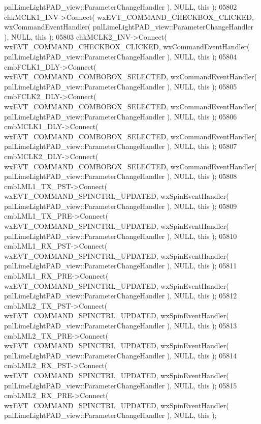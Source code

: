 \begin{DoxyCode}
      pnlLimeLightPAD_view::ParameterChangeHandler ), NULL, \textcolor{keyword}{this} );
05802     chkMCLK1_INV->Connect( wxEVT\_COMMAND\_CHECKBOX\_CLICKED, wxCommandEventHandler( 
      pnlLimeLightPAD_view::ParameterChangeHandler ), NULL, \textcolor{keyword}{this} );
05803     chkMCLK2_INV->Connect( wxEVT\_COMMAND\_CHECKBOX\_CLICKED, wxCommandEventHandler( 
      pnlLimeLightPAD_view::ParameterChangeHandler ), NULL, \textcolor{keyword}{this} );
05804     cmbFCLK1_DLY->Connect( wxEVT\_COMMAND\_COMBOBOX\_SELECTED, wxCommandEventHandler( 
      pnlLimeLightPAD_view::ParameterChangeHandler ), NULL, \textcolor{keyword}{this} );
05805     cmbFCLK2_DLY->Connect( wxEVT\_COMMAND\_COMBOBOX\_SELECTED, wxCommandEventHandler( 
      pnlLimeLightPAD_view::ParameterChangeHandler ), NULL, \textcolor{keyword}{this} );
05806     cmbMCLK1_DLY->Connect( wxEVT\_COMMAND\_COMBOBOX\_SELECTED, wxCommandEventHandler( 
      pnlLimeLightPAD_view::ParameterChangeHandler ), NULL, \textcolor{keyword}{this} );
05807     cmbMCLK2_DLY->Connect( wxEVT\_COMMAND\_COMBOBOX\_SELECTED, wxCommandEventHandler( 
      pnlLimeLightPAD_view::ParameterChangeHandler ), NULL, \textcolor{keyword}{this} );
05808     cmbLML1_TX_PST->Connect( wxEVT\_COMMAND\_SPINCTRL\_UPDATED, wxSpinEventHandler( 
      pnlLimeLightPAD_view::ParameterChangeHandler ), NULL, \textcolor{keyword}{this} );
05809     cmbLML1_TX_PRE->Connect( wxEVT\_COMMAND\_SPINCTRL\_UPDATED, wxSpinEventHandler( 
      pnlLimeLightPAD_view::ParameterChangeHandler ), NULL, \textcolor{keyword}{this} );
05810     cmbLML1_RX_PST->Connect( wxEVT\_COMMAND\_SPINCTRL\_UPDATED, wxSpinEventHandler( 
      pnlLimeLightPAD_view::ParameterChangeHandler ), NULL, \textcolor{keyword}{this} );
05811     cmbLML1_RX_PRE->Connect( wxEVT\_COMMAND\_SPINCTRL\_UPDATED, wxSpinEventHandler( 
      pnlLimeLightPAD_view::ParameterChangeHandler ), NULL, \textcolor{keyword}{this} );
05812     cmbLML2_TX_PST->Connect( wxEVT\_COMMAND\_SPINCTRL\_UPDATED, wxSpinEventHandler( 
      pnlLimeLightPAD_view::ParameterChangeHandler ), NULL, \textcolor{keyword}{this} );
05813     cmbLML2_TX_PRE->Connect( wxEVT\_COMMAND\_SPINCTRL\_UPDATED, wxSpinEventHandler( 
      pnlLimeLightPAD_view::ParameterChangeHandler ), NULL, \textcolor{keyword}{this} );
05814     cmbLML2_RX_PST->Connect( wxEVT\_COMMAND\_SPINCTRL\_UPDATED, wxSpinEventHandler( 
      pnlLimeLightPAD_view::ParameterChangeHandler ), NULL, \textcolor{keyword}{this} );
05815     cmbLML2_RX_PRE->Connect( wxEVT\_COMMAND\_SPINCTRL\_UPDATED, wxSpinEventHandler( 
      pnlLimeLightPAD_view::ParameterChangeHandler ), NULL, \textcolor{keyword}{this} );

\end{DoxyCode}
